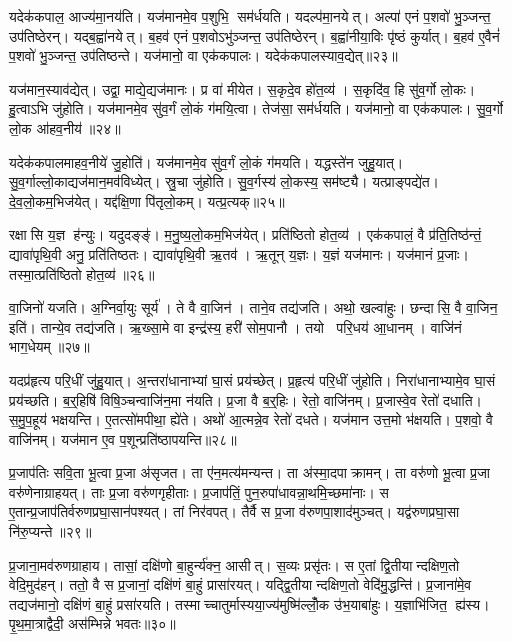 यदेक॑कपाल॒ आज्य॑मा॒नय॑ति।
यज॑मानमे॒व प॒शुभि॒ सम॑र्धयति।
यदल्प॑मा॒नयेत्।
अल्पा॑ एनं प॒शवो॑ भु॒ञ्जन्त॒ उप॑तिष्ठेरन्।
यद्ब॒ह्वा॑नयेत्।
ब॒हव॑ एनं प॒शवोऽभु॑ञ्जन्त॒ उप॑तिष्ठेरन्।
ब॒ह्वा॑नीया॒विः पृ॑ष्ठं कुर्यात्।
ब॒हव॑ ए॒वैनं॑ प॒शवो॑ भु॒ञ्जन्त॒ उप॑तिष्ठन्ते।
यज॑मानो॒ वा एक॑कपालः।
यदेक॑कपालस्याव॒द्येत्॥२३॥

यज॑मान॒स्याव॑द्येत्।
उद्वा॒ माद्ये॒द्यज॑मानः।
प्र वा॑ मीयेत।
स॒कृदे॒व हो॑त॒व्य॑।
स॒कृदि॑व॒ हि सु॑व॒र्गो लो॒कः।
हु॒त्वाऽभि जु॑होति।
यज॑मानमे॒व सु॑व॒र्गं लो॒कं ग॑मयि॒त्वा।
तेज॑सा॒ सम॑र्धयति।
यज॑मानो॒ वा एक॑कपालः।
सु॒व॒र्गो लो॒क आ॑हव॒नीय॑॥२४॥

यदेक॑कपालमाहव॒नीये॑ जु॒होति॑।
यज॑मानमे॒व सु॑व॒र्गं लो॒कं ग॑मयति।
यद्धस्ते॑न जुहु॒यात्।
सु॒व॒र्गाल्लो॒काद्यज॑मान॒मव॑विध्येत्।
स्रु॒चा जु॑होति।
सु॒व॒र्गस्य॑ लो॒कस्य॒ सम॑ष्ट्यै।
यत्प्राङ्पद्ये॑त।
दे॒व॒लो॒कम॒भिज॑येत्।
यद्द॑क्षि॒णा पि॑तृलो॒कम्।
यत्प्र॒त्यक्॥२५॥

रक्षासि य॒ज्ञ ह॑न्युः।
यदुदङ्ङ्॑।
म॒नु॒ष्य॒लो॒कम॒भिज॑येत्।
प्रति॑ष्ठितो होत॒व्य॑।
एक॑कपालं॒ वै प्र॑ति॒तिष्ठ॑न्तं॒ द्यावा॑पृथि॒वी अनु॒ प्रति॑तिष्ठतः।
द्यावा॑पृथि॒वी ऋ॒तव॑।
ऋ॒तून् य॒ज्ञः।
य॒ज्ञं यज॑मानः।
यज॑मानं प्र॒जाः।
तस्मा॒त्प्रति॑ष्ठितो होत॒व्य॑॥२६॥

वा॒जिनो॑ यजति।
अ॒ग्निर्वा॒युः सूर्य॑।
ते वै वा॒जिन॑।
ताने॒व तद्य॑जति।
अथो॒ खल्वा॑हुः।
छन्दासि॒ वै वा॒जिन॒ इति॑।
तान्ये॒व तद्य॑जति।
ऋ॒ख्सा॒मे वा इन्द्र॑स्य॒ हरी॑ सोम॒पानौ।
तयो परि॒धय॑ आ॒धानम्।
वाजि॑नं भाग॒धेयम्॥२७॥

यदप्र॑हृत्य परि॒धीं जु॑हु॒यात्।
अ॒न्तरा॑धानाभ्यां घा॒सं प्रय॑च्छेत्।
प्र॒हृत्य॑ परि॒धीं जु॑होति।
निरा॑धानाभ्यामे॒व घा॒सं प्रय॑च्छति।
ब॒र्॒हिषि॑ विषि॒ञ्चन्वाजि॑न॒मा न॑यति।
प्र॒जा वै ब॒र्॒हिः।
रेतो॒ वाजि॑नम्।
प्र॒जास्वे॒व रेतो॑ दधाति।
स॒मु॒प॒हूय॑ भक्षयन्ति।
ए॒तत्सो॑मपीथा॒ ह्ये॑ते।
अथो॑ आ॒त्मन्ने॒व रेतो॑ दधते।
यज॑मान उत्त॒मो भ॑क्षयति।
प॒शवो॒ वै वाजि॑नम्।
यज॑मान ए॒व प॒शून्प्रति॑ष्ठापयन्ति॥२८॥\anuvakamend[लो॒को ब॑हुरू॒पं भ॑व॒त्याज्य॑भागौ प॒शव॒ आज्य॑मव॒द्येदा॑हव॒नीय॑ प्र॒त्यक्तस्मा॒त्प्रति॑ष्ठितो होत॒व्यो॑ भाग॒धेय॑मे॒ते च॒त्वारि॑ च]

प्र॒जाप॑तिः सवि॒ता भू॒त्वा प्र॒जा अ॑सृजत।
ता ए॑न॒मत्य॑मन्यन्त।
ता अ॑स्मा॒दपाक्रामन्।
ता वरु॑णो भू॒त्वा प्र॒जा वरु॑णेनाग्राहयत्।
ताः प्र॒जा वरु॑णगृहीताः।
प्र॒जाप॑तिं॒ पुन॒रुपा॑धावन्ना॒थमि॒च्छमा॑नाः।
स ए॒तान्प्र॒जाप॑तिर्वरुणप्रघा॒सान॑पश्यत्।
तां निर॑वपत्।
तैर्वै स प्र॒जा व॑रुणपा॒शाद॑मुञ्चत्।
यद्व॑रुणप्रघा॒सा नि॑रु॒प्यन्ते॥२९॥

प्र॒जाना॒मव॑रुणग्राहाय।
तासां॒ दक्षि॑णो बा॒हुर्न्य॑क्न॒ आसीत्।
स॒व्यः प्रसृ॑तः।
स ए॒तां द्वि॒तीयान्दक्षिण॒तो वेदि॒मुद॑हन्।
ततो॒ वै स प्र॒जानां॒ दक्षि॑णं बा॒हुं प्रासा॑रयत्।
यद्द्वि॒तीयान्दक्षिण॒तो वेदि॑मु॒द्धन्ति॑।
प्र॒जाना॑मे॒व तद्यज॑मानो॒ दक्षि॑णं बा॒हुं प्रसा॑रयति।
तस्माच्चातुर्मास्यया॒ज्य॑मुष्मि॑ल्लोँ॒क उ॑भ॒याबा॑हुः।
य॒ज्ञाभि॑जित॒ ह्य॑स्य।
पृ॒थ॒मा॒त्राद्वैदी॒ अस॑म्भिन्ने भवतः॥३०॥

